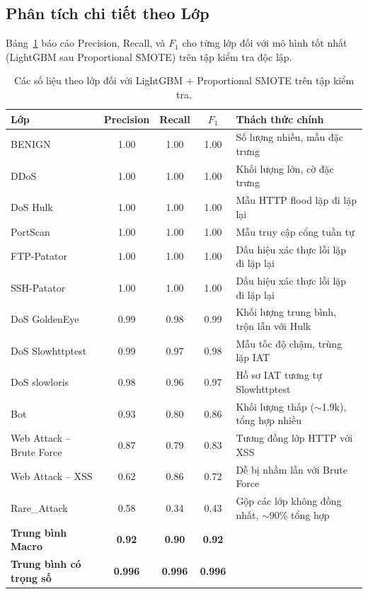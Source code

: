 \subsection{Phân tích chi tiết theo Lớp}
\label{sec:exp-per-class}

Bảng~\ref{tab:per-class} báo cáo Precision, Recall, và $F_1$ cho từng lớp đối với mô hình tốt nhất (LightGBM sau Proportional SMOTE) trên tập kiểm tra độc lập.

\begin{table}[h]
\centering
\caption{Các số liệu theo lớp đối với LightGBM + Proportional SMOTE trên tập kiểm tra.}
\label{tab:per-class}
\begin{tabular}{lcccl}
\toprule
\textbf{Lớp} & \textbf{Precision} & \textbf{Recall} & \textbf{$F_1$} & \textbf{Thách thức chính}  \\
\midrule
BENIGN                   & 1.00 & 1.00 & 1.00 & Số lượng nhiều, mẫu đặc trưng  \\
DDoS                     & 1.00 & 1.00 & 1.00 & Khối lượng lớn, cờ đặc trưng  \\
DoS Hulk                 & 1.00 & 1.00 & 1.00 & Mẫu HTTP flood lặp đi lặp lại  \\
PortScan                 & 1.00 & 1.00 & 1.00 & Mẫu truy cập cổng tuần tự  \\
FTP-Patator              & 1.00 & 1.00 & 1.00 & Dấu hiệu xác thực lỗi lặp đi lặp lại  \\
SSH-Patator              & 1.00 & 1.00 & 1.00 & Dấu hiệu xác thực lỗi lặp đi lặp lại  \\
DoS GoldenEye            & 0.99 & 0.98 & 0.99 & Khối lượng trung bình, trộn lẫn với Hulk  \\
DoS Slowhttptest         & 0.99 & 0.97 & 0.98 & Mẫu tốc độ chậm, trùng lặp IAT  \\
DoS slowloris            & 0.98 & 0.96 & 0.97 & Hồ sơ IAT tương tự Slowhttptest  \\
Bot                      & 0.93 & 0.80 & 0.86 & Khối lượng thấp ($\sim$1.9k), tổng hợp nhiều  \\
Web Attack -- Brute Force & 0.87 & 0.79 & 0.83 & Tương đồng lớp HTTP với XSS  \\
Web Attack -- XSS        & 0.62 & 0.86 & 0.72 & Dễ bị nhầm lẫn với Brute Force  \\
Rare\_Attack             & 0.58 & 0.34 & 0.43 & Gộp các lớp không đồng nhất, $\sim$90\% tổng hợp  \\
\midrule
\textbf{Trung bình Macro} & \textbf{0.92} & \textbf{0.90} & \textbf{0.92} &  \\
\textbf{Trung bình có trọng số} & \textbf{0.996} & \textbf{0.996} & \textbf{0.996} &  \\
\bottomrule
\end{tabular}
\end{table}

